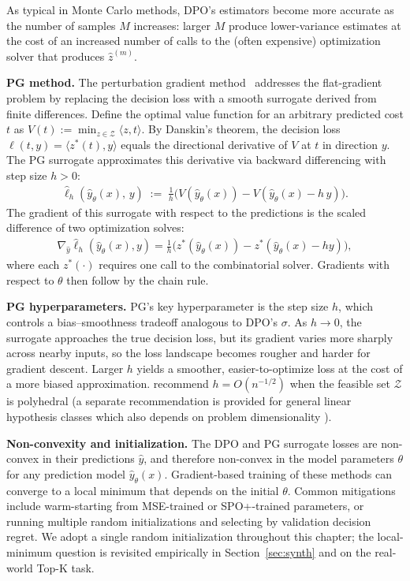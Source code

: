 As typical in Monte Carlo methods, DPO's estimators become more accurate as the number of samples $M$ increases: larger $M$ produce lower-variance estimates at the cost of an increased number of calls to the (often expensive) optimization solver that produces $\hat{z}^{(m)}$.

\textbf{PG method.} 
The perturbation gradient method~\citep{huang2024decisionfocusedPG} addresses the flat-gradient problem by replacing the decision loss with a smooth surrogate derived from finite differences.
Define the optimal value function for an arbitrary predicted cost $t$ as $V(t) := \min_{z \in \mathcal{Z}} \langle z, t \rangle$.
By Danskin's theorem, the decision loss $\ell(t, y) = \langle z^*(t), y \rangle$ equals the directional derivative of $V$ at $t$ in direction $y$.
The PG surrogate approximates this derivative via backward differencing with step size $h > 0$:
\begin{align}
\hat{\ell}_h(\hat{y}_\theta(x),\, y)
\;:=\;
\tfrac{1}{h}\Big(
  V(\hat{y}_\theta(x)) - V(\hat{y}_\theta(x) - h\, y)
\Big).
\end{align}
The gradient of this surrogate with respect to the predictions is the scaled difference of two optimization solves:
\begin{align}
\nabla_{\hat{y}} \hat{\ell}_h(\hat{y}_\theta(x), y)
= \tfrac{1}{h}\Big(z^*(\hat{y}_\theta(x)) - z^*(\hat{y}_\theta(x) - hy)\Big),
\end{align}
where each $z^*(\cdot)$ requires one call to the combinatorial solver. Gradients with respect to $\theta$ then follow by the chain rule. 

\textbf{PG hyperparameters.}
PG's key hyperparameter is the step size $h$, which controls a bias--smoothness tradeoff analogous to DPO's $\sigma$. As $h \to 0$, the surrogate approaches the true decision loss, but its gradient varies more sharply across nearby inputs, so the loss landscape becomes rougher and harder for gradient descent. Larger $h$ yields a smoother, easier-to-optimize loss at the cost of a more biased approximation. \citeauthor{huang2024decisionfocusedPG} recommend $h = O(n^{-1/2})$ when the feasible set $\mathcal{Z}$ is polyhedral (a separate recommendation is provided for general linear hypothesis classes which also depends on problem dimensionality \citep[Theorem 3.4]{huang2024decisionfocusedPG}).

\textbf{Non-convexity and initialization.}
The DPO and PG surrogate losses are non-convex in their predictions $\hat{y}$, and therefore non-convex in the model parameters $\theta$ for any prediction model $\hat{y}_\theta(x)$. Gradient-based training of these methods can converge to a local minimum that depends on the initial $\theta$. Common mitigations include warm-starting from MSE-trained or SPO+-trained parameters, or running multiple random initializations and selecting by validation decision regret. We adopt a single random initialization throughout this chapter; the local-minimum question is revisited empirically in Section~\ref{sec:synth} and on the real-world Top-K task.



